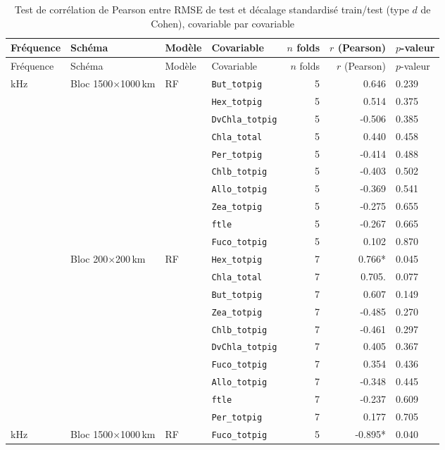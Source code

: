 \begin{longtable}{llllrrl}
\caption{Test de corr\'elation de Pearson entre RMSE de test et d\'ecalage standardis\'e train/test (type $d$ de Cohen), covariable par covariable}
\label{tab:covariate_distance_significance}\\
\toprule
Fr\'equence & Sch\'ema & Mod\`ele & Covariable & $n$ folds & $r$ (Pearson) & $p$-valeur \\
\midrule
\endfirsthead
\toprule
Fr\'equence & Sch\'ema & Mod\`ele & Covariable & $n$ folds & $r$ (Pearson) & $p$-valeur \\
\midrule
\endhead
\bottomrule
\endfoot
38 kHz & Bloc 1500$\times$1000\,km & RF & \texttt{But_totpig} & 5 & 0.646 & 0.239 \\
 &  &  & \texttt{Hex_totpig} & 5 & 0.514 & 0.375 \\
 &  &  & \texttt{DvChla_totpig} & 5 & -0.506 & 0.385 \\
 &  &  & \texttt{Chla_total} & 5 & 0.440 & 0.458 \\
 &  &  & \texttt{Per_totpig} & 5 & -0.414 & 0.488 \\
 &  &  & \texttt{Chlb_totpig} & 5 & -0.403 & 0.502 \\
 &  &  & \texttt{Allo_totpig} & 5 & -0.369 & 0.541 \\
 &  &  & \texttt{Zea_totpig} & 5 & -0.275 & 0.655 \\
 &  &  & \texttt{ftle} & 5 & -0.267 & 0.665 \\
 &  &  & \texttt{Fuco_totpig} & 5 & 0.102 & 0.870 \\
\addlinespace
 & Bloc 200$\times$200\,km & RF & \texttt{Hex_totpig} & 7 & 0.766* & 0.045 \\
 &  &  & \texttt{Chla_total} & 7 & 0.705. & 0.077 \\
 &  &  & \texttt{But_totpig} & 7 & 0.607 & 0.149 \\
 &  &  & \texttt{Zea_totpig} & 7 & -0.485 & 0.270 \\
 &  &  & \texttt{Chlb_totpig} & 7 & -0.461 & 0.297 \\
 &  &  & \texttt{DvChla_totpig} & 7 & 0.405 & 0.367 \\
 &  &  & \texttt{Fuco_totpig} & 7 & 0.354 & 0.436 \\
 &  &  & \texttt{Allo_totpig} & 7 & -0.348 & 0.445 \\
 &  &  & \texttt{ftle} & 7 & -0.237 & 0.609 \\
 &  &  & \texttt{Per_totpig} & 7 & 0.177 & 0.705 \\
\addlinespace
120 kHz & Bloc 1500$\times$1000\,km & RF & \texttt{Fuco_totpig} & 5 & -0.895* & 0.040 \\

\end{longtable}
